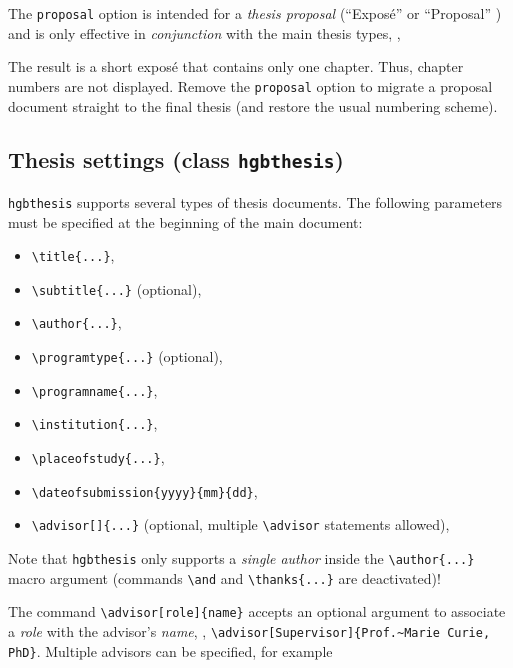 \documentclass[english]{hgbarticle}
\begin{document}
The \texttt{proposal} option is intended for a \emph{thesis proposal} (``Exposé'' or ``Proposal'' ) and is 
only effective in \emph{conjunction} with the main thesis types, \eg,
%
%
The result is a short exposé that contains only one chapter. Thus,
chapter numbers are not displayed. Remove the \texttt{proposal} option to
migrate a proposal document straight to the final thesis (and restore the usual
numbering scheme).

\subsection{Thesis settings (class \texttt{hgbthesis})}

\texttt{hgbthesis} supports several types of thesis documents. The following
parameters must be specified at the beginning of the main document:
%
\begin{itemize}
    \item \verb!\title{...}!,
    \item \verb!\subtitle{...}! (optional),
    \item \verb!\author{...}!,
    \item \verb!! (optional), 
    \item \verb!!,
    \item \verb!!,
    \item \verb!!,
    \item \verb!!,
    \item \verb!! (optional, multiple \verb!\advisor! statements allowed),
\end{itemize}
%
Note that \texttt{hgbthesis} only supports a \emph{single author} inside the
\verb!\author{...}! macro argument (commands \verb!\and! and
\verb!\thanks{...}! are deactivated)!

The command \verb!! accepts an optional argument to associate a \emph{role} 
with the advisor's \emph{name}, \eg, \verb!!.
Multiple advisors can be specified, for example
\begin{LaTeXCode}[numbers=none]
\end{LaTeXCode}
\end{document}
